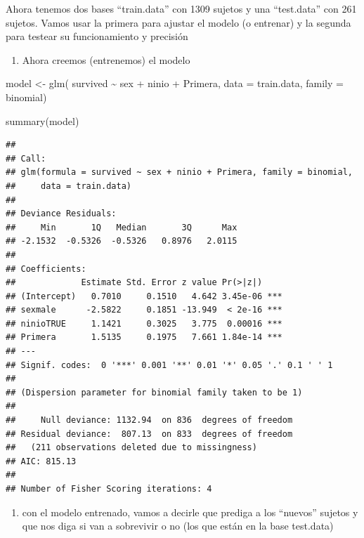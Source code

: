 \documentclass[
]{book}
\newenvironment{Shaded}{\begin{snugshade}}{\end{snugshade}}
\newcommand{\AttributeTok}[1]{\textcolor[rgb]{0.77,0.63,0.00}{#1}}
\newcommand{\FunctionTok}[1]{\textcolor[rgb]{0.00,0.00,0.00}{#1}}
\newcommand{\NormalTok}[1]{#1}
\newcommand{\OtherTok}[1]{\textcolor[rgb]{0.56,0.35,0.01}{#1}}
\newcommand{\SpecialCharTok}[1]{\textcolor[rgb]{0.00,0.00,0.00}{#1}}
\providecommand{\tightlist}{%
  \setlength{\itemsep}{0pt}\setlength{\parskip}{0pt}}
\begin{document}
Ahora tenemos dos bases ``train.data'' con 1309 sujetos y una ``test.data'' con 261 sujetos. Vamos usar la primera para ajustar el modelo (o entrenar) y la segunda para testear su funcionamiento y precisión

\begin{enumerate}
\def\labelenumi{\arabic{enumi}.}
\setcounter{enumi}{1}
\tightlist
\item
  Ahora creemos (entrenemos) el modelo
\end{enumerate}

\begin{Shaded}
\begin{Highlighting}[]
\NormalTok{model }\OtherTok{\textless{}{-}} \FunctionTok{glm}\NormalTok{( survived }\SpecialCharTok{\textasciitilde{}}\NormalTok{ sex }\SpecialCharTok{+}\NormalTok{ ninio }\SpecialCharTok{+}\NormalTok{ Primera, }\AttributeTok{data =}\NormalTok{ train.data, }\AttributeTok{family =}\NormalTok{ binomial)}

\FunctionTok{summary}\NormalTok{(model)}
\end{Highlighting}
\end{Shaded}

\begin{verbatim}
## 
## Call:
## glm(formula = survived ~ sex + ninio + Primera, family = binomial, 
##     data = train.data)
## 
## Deviance Residuals: 
##     Min       1Q   Median       3Q      Max  
## -2.1532  -0.5326  -0.5326   0.8976   2.0115  
## 
## Coefficients:
##             Estimate Std. Error z value Pr(>|z|)    
## (Intercept)   0.7010     0.1510   4.642 3.45e-06 ***
## sexmale      -2.5822     0.1851 -13.949  < 2e-16 ***
## ninioTRUE     1.1421     0.3025   3.775  0.00016 ***
## Primera       1.5135     0.1975   7.661 1.84e-14 ***
## ---
## Signif. codes:  0 '***' 0.001 '**' 0.01 '*' 0.05 '.' 0.1 ' ' 1
## 
## (Dispersion parameter for binomial family taken to be 1)
## 
##     Null deviance: 1132.94  on 836  degrees of freedom
## Residual deviance:  807.13  on 833  degrees of freedom
##   (211 observations deleted due to missingness)
## AIC: 815.13
## 
## Number of Fisher Scoring iterations: 4
\end{verbatim}

\begin{enumerate}
\def\labelenumi{\arabic{enumi}.}
\setcounter{enumi}{2}
\tightlist
\item
  con el modelo entrenado, vamos a decirle que prediga a los ``nuevos'' sujetos y que nos diga si van a sobrevivir o no (los que están en la base test.data)
\end{enumerate}
\end{document}
